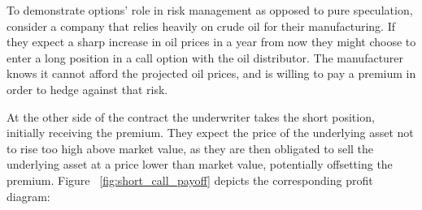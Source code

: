 \documentclass[english,12pt,a4paper,pdftex,sci,utf8]{aaltothesis}
\begin{document}
To demonstrate options' role in risk management as opposed to pure speculation, consider a company that relies heavily on crude oil for their manufacturing. If they expect a sharp increase in oil prices in a year from now they might choose to enter a long position in a call option with the oil distributor. The manufacturer knows it cannot afford the projected oil prices, and is willing to pay a premium in order to hedge against that risk.

At the other side of the contract the underwriter takes the short position, initially receiving the premium. They expect the price of the underlying asset not to rise too high above market value, as they are then obligated to sell the underlying asset at a price lower than market value, potentially offsetting the premium. Figure ~\ref{fig:short_call_payoff} depicts the corresponding profit diagram:
\end{document}
